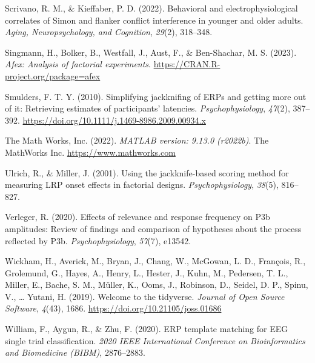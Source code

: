 \documentclass[
  man]{apa7}
\newlength{\cslhangindent}
\newlength{\cslentryspacingunit} %
\newenvironment{CSLReferences}[2] %
 {%
  \setlength{\parindent}{0pt}
  \ifodd #1
  \let\oldpar\par
  \def\par{\hangindent=\cslhangindent\oldpar}
  \fi
  \setlength{\parskip}{#2\cslentryspacingunit}
 }%
 {}
\begin{document}
\begin{CSLReferences}{1}{0}
\leavevmode{}%
Scrivano, R. M., \& Kieffaber, P. D. (2022). Behavioral and electrophysiological correlates of {Simon} and flanker conflict interference in younger and older adults. \emph{Aging, Neuropsychology, and Cognition}, \emph{29}(2), 318--348.

\leavevmode{}%
Singmann, H., Bolker, B., Westfall, J., Aust, F., \& Ben-Shachar, M. S. (2023). \emph{Afex: Analysis of factorial experiments}. \url{https://CRAN.R-project.org/package=afex}

\leavevmode{}%
Smulders, F. T. Y. (2010). Simplifying jackknifing of {ERPs} and getting more out of it: {Retrieving} estimates of participants' latencies. \emph{Psychophysiology}, \emph{47}(2), 387--392. \url{https://doi.org/10.1111/j.1469-8986.2009.00934.x}

\leavevmode{}%
The Math Works, Inc. (2022). \emph{{MATLAB} version: 9.13.0 (r2022b)}. The MathWorks Inc. \url{https://www.mathworks.com}

\leavevmode{}%
Ulrich, R., \& Miller, J. (2001). Using the jackknife-based scoring method for measuring {LRP} onset effects in factorial designs. \emph{Psychophysiology}, \emph{38}(5), 816--827.

\leavevmode{}%
Verleger, R. (2020). Effects of relevance and response frequency on {P3b} amplitudes: {Review} of findings and comparison of hypotheses about the process reflected by {P3b}. \emph{Psychophysiology}, \emph{57}(7), e13542.

\leavevmode{}%
Wickham, H., Averick, M., Bryan, J., Chang, W., McGowan, L. D., François, R., Grolemund, G., Hayes, A., Henry, L., Hester, J., Kuhn, M., Pedersen, T. L., Miller, E., Bache, S. M., Müller, K., Ooms, J., Robinson, D., Seidel, D. P., Spinu, V., \ldots{} Yutani, H. (2019). Welcome to the {tidyverse}. \emph{Journal of Open Source Software}, \emph{4}(43), 1686. \url{https://doi.org/10.21105/joss.01686}

\leavevmode{}%
William, F., Aygun, R., \& Zhu, F. (2020). {ERP} template matching for {EEG} single trial classification. \emph{2020 {IEEE} International Conference on Bioinformatics and Biomedicine ({BIBM})}, 2876--2883.


\end{CSLReferences}
\end{document}
